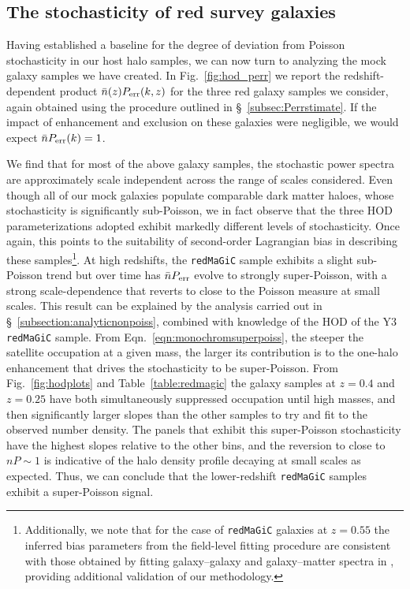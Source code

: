 \documentclass[fleqn,usenatbib]{mnras}
\newcommand{\redmagic}{\texttt{redMaGiC} }
\begin{document}
\subsection{The stochasticity of red survey galaxies}
\label{subsec:hodperr}
Having established a baseline for the degree of deviation from Poisson stochasticity in our host halo samples, we can now turn to analyzing the mock galaxy samples we have created. In Fig.~\ref{fig:hod_perr} we report the redshift-dependent product $\bar{n}(z) P_{\rm err}(k,z)$ for the three red galaxy samples we consider, again obtained using the procedure outlined in \S~\ref{subsec:Perrstimate}. If the impact of enhancement and exclusion on these galaxies were negligible, we would expect $\bar{n} P_{\rm err}(k)=1$. \par 
We find that for most of the above galaxy samples, the stochastic power spectra are approximately scale independent across the range of scales considered. Even though all of our mock galaxies populate comparable dark matter haloes, whose stochasticity is significantly sub-Poisson, we in fact observe that the three HOD parameterizations adopted exhibit markedly different levels of stochasticity.  Once again, this points to the suitability of second-order Lagrangian bias in describing these samples\footnote{ Additionally, we note that for the case of \redmagic galaxies at $z=0.55$ the inferred bias parameters from the field-level fitting procedure are consistent with those obtained by fitting galaxy--galaxy and galaxy--matter spectra in \cite{Kokron_2021}, providing additional validation of our methodology.}. At high redshifts, the \redmagic sample exhibits a slight sub-Poisson trend but over time has $\bar{n} P_{\rm err}$ evolve to strongly super-Poisson, with a strong scale-dependence that reverts to close to the Poisson measure at small scales. This result can be explained by the analysis carried out in \S~\ref{subsection:analyticnonpoiss}, combined with knowledge of the HOD of the Y3 \redmagic sample. From Eqn.~\ref{eqn:monochromsuperpoiss}, the steeper the satellite occupation at a given mass, the larger its contribution is to the one-halo enhancement that drives the stochasticity to be super-Poisson. From Fig.~\ref{fig:hodplots} and Table~\ref{table:redmagic} the galaxy samples at $z=0.4$ and $z=0.25$ have both simultaneously suppressed occupation until high masses, and then significantly larger slopes than the other samples to try and fit to the observed number density. The panels that exhibit this super-Poisson stochasticity have the highest slopes relative to the other bins, and the reversion to close to $nP \sim 1$ is indicative of the halo density profile decaying at small scales as expected. Thus, we can conclude that the lower-redshift \redmagic samples exhibit a super-Poisson signal. \par
\end{document}
